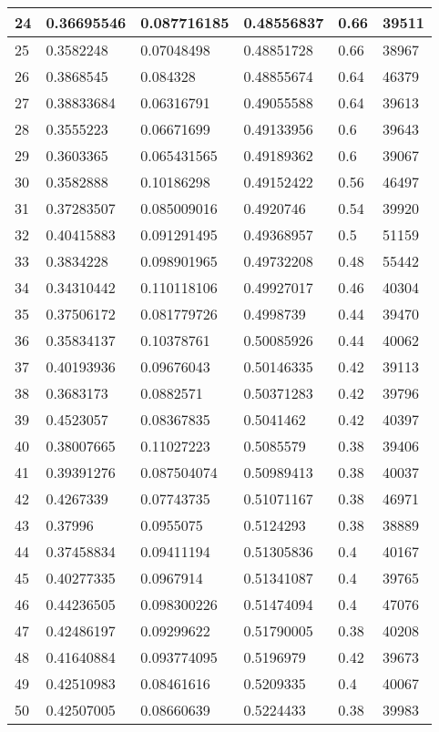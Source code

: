 \begin{longtable}{|l|l|l|l|l|l|}
24 & 0.36695546 & 0.087716185 & 0.48556837 & 0.66 & 39511 \\ \hline 
25 & 0.3582248 & 0.07048498 & 0.48851728 & 0.66 & 38967 \\ \hline 
26 & 0.3868545 & 0.084328 & 0.48855674 & 0.64 & 46379 \\ \hline 
27 & 0.38833684 & 0.06316791 & 0.49055588 & 0.64 & 39613 \\ \hline 
28 & 0.3555223 & 0.06671699 & 0.49133956 & 0.6 & 39643 \\ \hline 
29 & 0.3603365 & 0.065431565 & 0.49189362 & 0.6 & 39067 \\ \hline 
30 & 0.3582888 & 0.10186298 & 0.49152422 & 0.56 & 46497 \\ \hline 
31 & 0.37283507 & 0.085009016 & 0.4920746 & 0.54 & 39920 \\ \hline 
32 & 0.40415883 & 0.091291495 & 0.49368957 & 0.5 & 51159 \\ \hline 
33 & 0.3834228 & 0.098901965 & 0.49732208 & 0.48 & 55442 \\ \hline 
34 & 0.34310442 & 0.110118106 & 0.49927017 & 0.46 & 40304 \\ \hline 
35 & 0.37506172 & 0.081779726 & 0.4998739 & 0.44 & 39470 \\ \hline 
36 & 0.35834137 & 0.10378761 & 0.50085926 & 0.44 & 40062 \\ \hline 
37 & 0.40193936 & 0.09676043 & 0.50146335 & 0.42 & 39113 \\ \hline 
38 & 0.3683173 & 0.0882571 & 0.50371283 & 0.42 & 39796 \\ \hline 
39 & 0.4523057 & 0.08367835 & 0.5041462 & 0.42 & 40397 \\ \hline 
40 & 0.38007665 & 0.11027223 & 0.5085579 & 0.38 & 39406 \\ \hline 
41 & 0.39391276 & 0.087504074 & 0.50989413 & 0.38 & 40037 \\ \hline 
42 & 0.4267339 & 0.07743735 & 0.51071167 & 0.38 & 46971 \\ \hline 
43 & 0.37996 & 0.0955075 & 0.5124293 & 0.38 & 38889 \\ \hline 
44 & 0.37458834 & 0.09411194 & 0.51305836 & 0.4 & 40167 \\ \hline 
45 & 0.40277335 & 0.0967914 & 0.51341087 & 0.4 & 39765 \\ \hline 
46 & 0.44236505 & 0.098300226 & 0.51474094 & 0.4 & 47076 \\ \hline 
47 & 0.42486197 & 0.09299622 & 0.51790005 & 0.38 & 40208 \\ \hline 
48 & 0.41640884 & 0.093774095 & 0.5196979 & 0.42 & 39673 \\ \hline 
49 & 0.42510983 & 0.08461616 & 0.5209335 & 0.4 & 40067 \\ \hline 
50 & 0.42507005 & 0.08660639 & 0.5224433 & 0.38 & 39983 \\ \hline 
\end{longtable}